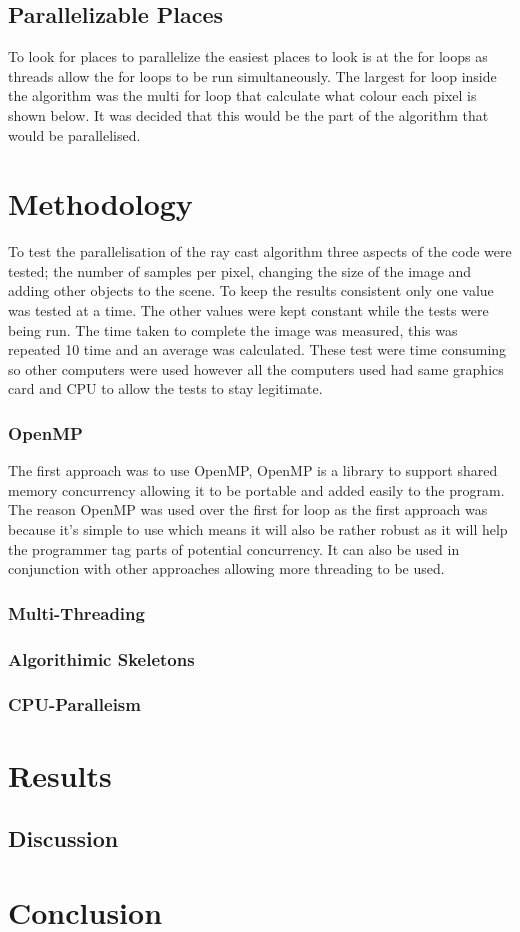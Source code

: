 \documentclass[journal,transmag]{IEEEtran}
\begin{document}
	\subsection{Parallelizable Places}
To look for places to parallelize the easiest places to look is at the for loops as threads allow the for loops to be run simultaneously. The largest for loop inside the algorithm was the multi for loop that calculate what colour each pixel is shown below. It was decided that this would be the part of the algorithm that would be parallelised.
\newpage 

	
\section{Methodology}
To test the parallelisation of the ray cast algorithm three aspects of the code were tested; the number of samples per pixel, changing the size of the image and adding other objects to the scene. To keep the results consistent only one value was tested at a time. The other values were kept constant while the tests were being run. The time taken to complete the image was measured, this was repeated 10 time and an average was calculated. These test were time consuming so other computers were used however all the computers used had same graphics card and CPU to allow the tests to stay legitimate. 
	\subsubsection{OpenMP}
	The first approach was to use OpenMP, OpenMP is a library to support shared memory concurrency allowing it to be portable and added easily to the program. The reason OpenMP was used over the first for loop as the first approach was because it’s simple to use which means it will also be rather robust as it will help the programmer tag parts of potential concurrency. It can also be used in conjunction with other approaches allowing more threading to be used.
	\subsubsection{Multi-Threading}
	\subsubsection{Algorithimic Skeletons}
	\subsubsection{CPU-Paralleism}

\section{Results}
	\subsection{Discussion}
	
\section{Conclusion}
	

\newpage




\end{document}
